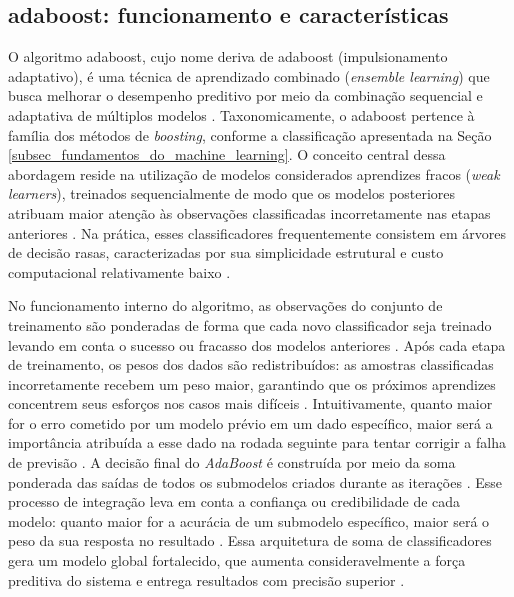\subsection{\acs{adaboost}: funcionamento e características}
\label{subsec_adaboost_funcionamento_e_caracteristicas}

O algoritmo \acs{adaboost}, cujo nome deriva de \acl{adaboost} (impulsionamento adaptativo), é uma técnica de aprendizado combinado (\textit{ensemble learning}) que busca melhorar o desempenho preditivo por meio da combinação sequencial e adaptativa de múltiplos modelos \cite{busari2021crude}. Taxonomicamente, o \acs{adaboost} pertence à família dos métodos de \textit{boosting}, conforme a classificação apresentada na Seção \ref{subsec_fundamentos_do_machine_learning}. O conceito central dessa abordagem reside na utilização de modelos considerados aprendizes fracos (\textit{weak learners}), treinados sequencialmente de modo que os modelos posteriores atribuam maior atenção às observações classificadas incorretamente nas etapas anteriores \cite{park2023intelligent}. Na prática, esses classificadores frequentemente consistem em árvores de decisão rasas, caracterizadas por sua simplicidade estrutural e custo computacional relativamente baixo \cite{derbentsev2021comparative}.

No funcionamento interno do algoritmo, as observações do conjunto de treinamento são ponderadas de forma que cada novo classificador seja treinado levando em conta o sucesso ou fracasso dos modelos anteriores \cite{busari2021crude}. Após cada etapa de treinamento, os pesos dos dados são redistribuídos: as amostras classificadas incorretamente recebem um peso maior, garantindo que os próximos aprendizes concentrem seus esforços nos casos mais difíceis \cite{busari2021crude}. Intuitivamente, quanto maior for o erro cometido por um modelo prévio em um dado específico, maior será a importância atribuída a esse dado na rodada seguinte para tentar corrigir a falha de previsão \cite{park2023intelligent}. A decisão final do \textit{AdaBoost} é construída por meio da soma ponderada das saídas de todos os submodelos criados durante as iterações \cite{park2023intelligent}. Esse processo de integração leva em conta a confiança ou credibilidade de cada modelo: quanto maior for a acurácia de um submodelo específico, maior será o peso da sua resposta no resultado \cite{park2023intelligent}. Essa arquitetura de soma de classificadores gera um modelo global fortalecido, que aumenta consideravelmente a força preditiva do sistema e entrega resultados com precisão superior \cite{busari2021crude}.


